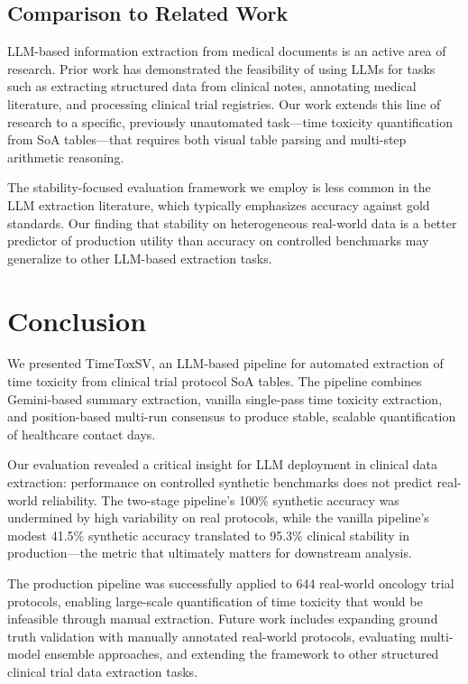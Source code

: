\documentclass[11pt]{article}
\begin{document}
\subsection{Comparison to Related Work}

LLM-based information extraction from medical documents is an active area of research. Prior work has demonstrated the feasibility of using LLMs for tasks such as extracting structured data from clinical notes, annotating medical literature, and processing clinical trial registries. Our work extends this line of research to a specific, previously unautomated task---time toxicity quantification from SoA tables---that requires both visual table parsing and multi-step arithmetic reasoning.

The stability-focused evaluation framework we employ is less common in the LLM extraction literature, which typically emphasizes accuracy against gold standards. Our finding that stability on heterogeneous real-world data is a better predictor of production utility than accuracy on controlled benchmarks may generalize to other LLM-based extraction tasks.

\section{Conclusion}

We presented TimeToxSV, an LLM-based pipeline for automated extraction of time toxicity from clinical trial protocol SoA tables. The pipeline combines Gemini-based summary extraction, vanilla single-pass time toxicity extraction, and position-based multi-run consensus to produce stable, scalable quantification of healthcare contact days.

Our evaluation revealed a critical insight for LLM deployment in clinical data extraction: performance on controlled synthetic benchmarks does not predict real-world reliability. The two-stage pipeline's 100\% synthetic accuracy was undermined by high variability on real protocols, while the vanilla pipeline's modest 41.5\% synthetic accuracy translated to 95.3\% clinical stability in production---the metric that ultimately matters for downstream analysis.

The production pipeline was successfully applied to 644 real-world oncology trial protocols, enabling large-scale quantification of time toxicity that would be infeasible through manual extraction. Future work includes expanding ground truth validation with manually annotated real-world protocols, evaluating multi-model ensemble approaches, and extending the framework to other structured clinical trial data extraction tasks.
\end{document}
